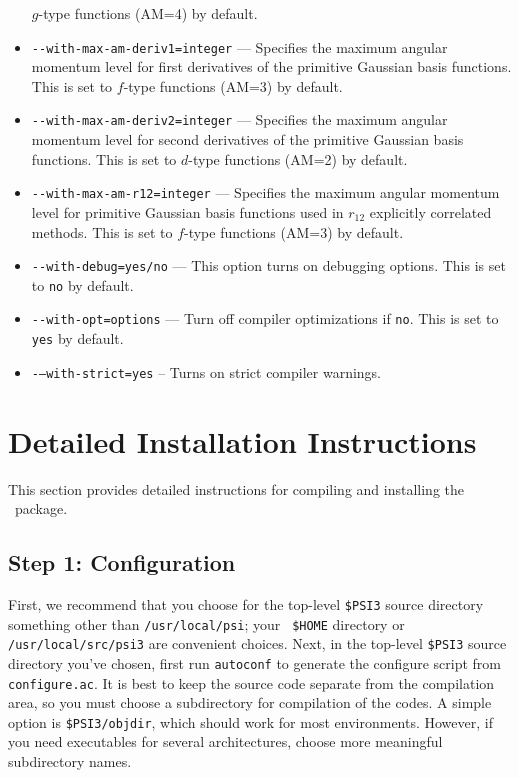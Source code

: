 \documentclass[12pt]{article}
\begin{document}
\begin{itemize}
  $g$-type functions (AM=4) by default.
\item {\tt -}{\tt -with-max-am-deriv1=integer} --- Specifies the maximum
  angular momentum level for first derivatives of the primitive
  Gaussian basis functions.  This is set to $f$-type functions (AM=3)
  by default.
\item {\tt -}{\tt -with-max-am-deriv2=integer} --- Specifies the maximum
  angular momentum level for second derivatives of the primitive
  Gaussian basis functions.  This is set to $d$-type functions (AM=2)
  by default.
\item {\tt -}{\tt -with-max-am-r12=integer} --- Specifies the maximum
  angular momentum level for primitive Gaussian basis functions used
  in $r_{12}$ explicitly correlated methods.  This is set to $f$-type
  functions (AM=3) by default.
\item {\tt -}{\tt -with-debug=yes/no} --- This option turns on debugging
  options.  This is set to {\tt no} by default.
\item {\tt -}{\tt -with-opt=options} --- Turn off compiler
  optimizations if {\tt no}.  This is set to {\tt yes} by default.
\item {\tt -}{\tt --with-strict=yes} -- Turns on strict compiler warnings.
\end{itemize}

\section{Detailed Installation Instructions}

This section provides detailed instructions for compiling and
installing the \PSIthree\ package.  

\subsection{Step 1: Configuration}

First, we recommend that you choose for the top-level {\tt \$PSI3}
source directory something other than {\tt /usr/local/psi}; your {\tt
  \$HOME} directory or {\tt /usr/local/src/psi3} are convenient
choices.  Next, in the top-level {\tt \$PSI3} source directory you've
chosen, first run {\tt autoconf} to generate the configure script from
{\tt configure.ac}.  It is best to keep the source code separate from
the compilation area, so you must choose a subdirectory for
compilation of the codes.  A simple option is {\tt \$PSI3/objdir},
which should work for most environments.  However, if you need
executables for several architectures, choose more meaningful
subdirectory names.
\end{document}
